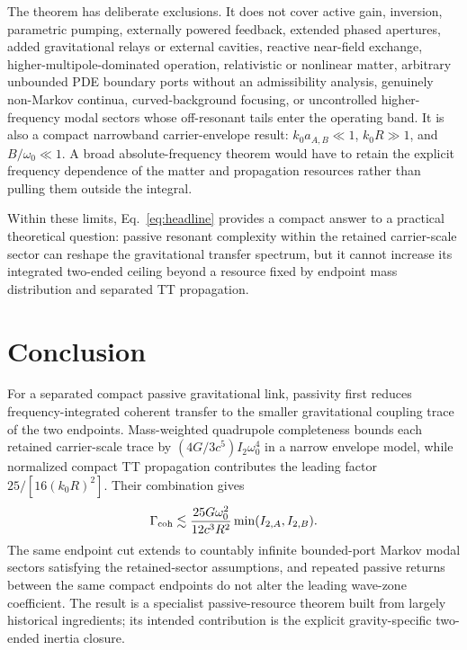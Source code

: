 The theorem has deliberate exclusions. It does not cover active gain, inversion, parametric pumping, externally powered feedback, extended phased apertures, added gravitational relays or external cavities, reactive near-field exchange, higher-multipole-dominated operation, relativistic or nonlinear matter, arbitrary unbounded PDE boundary ports without an admissibility analysis, genuinely non-Markov continua, curved-background focusing, or uncontrolled higher-frequency modal sectors whose off-resonant tails enter the operating band. It is also a compact narrowband carrier-envelope result: $k_0a_{A,B}\ll1$, $k_0R\gg1$, and $B/\omega_0\ll1$. A broad absolute-frequency theorem would have to retain the explicit frequency dependence of the matter and propagation resources rather than pulling them outside the integral.

Within these limits, Eq.~\eqref{eq:headline} provides a compact answer to a practical theoretical question: passive resonant complexity within the retained carrier-scale sector can reshape the gravitational transfer spectrum, but it cannot increase its integrated two-ended ceiling beyond a resource fixed by endpoint mass distribution and separated TT propagation.

\section{Conclusion}

For a separated compact passive gravitational link, passivity first reduces frequency-integrated coherent transfer to the smaller gravitational coupling trace of the two endpoints. Mass-weighted quadrupole completeness bounds each retained carrier-scale trace by $(4G/3c^5)I_2\omega_0^4$ in a narrow envelope model, while normalized compact TT propagation contributes the leading factor $25/[16(k_0R)^2]$. Their combination gives
\begin{equation}
\Gamma_{\rm coh}
\lesssim
\frac{25G\omega_0^2}{12c^3R^2}
\min(I_{2,A},I_{2,B}).
\end{equation}
The same endpoint cut extends to countably infinite bounded-port Markov modal sectors satisfying the retained-sector assumptions, and repeated passive returns between the same compact endpoints do not alter the leading wave-zone coefficient. The result is a specialist passive-resource theorem built from largely historical ingredients; its intended contribution is the explicit gravity-specific two-ended inertia closure.

